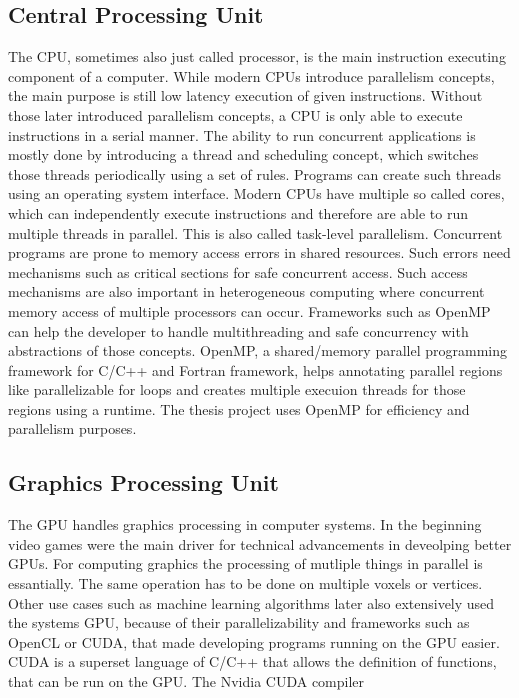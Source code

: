 \subsection{Central Processing Unit}
The \acrshort{CPU}, sometimes also just called processor, is the main instruction executing component of a computer. While modern \acrshort{CPU}s introduce parallelism concepts, the main purpose is still low latency execution of given instructions.
Without those later introduced parallelism concepts, a \acrshort{CPU} is only able to execute instructions in a serial manner. The ability to run concurrent applications is mostly done by introducing a thread and scheduling concept, which switches those threads periodically using a set of rules. Programs can create such threads using an operating system interface.
Modern \acrshort{CPU}s have multiple so called cores, which can independently execute instructions and therefore are able to run multiple threads in parallel. This is also called task-level parallelism.
Concurrent programs are prone to memory access errors in shared resources. Such errors need mechanisms such as critical sections for safe concurrent access. Such access mechanisms are also important in heterogeneous computing where concurrent memory access of multiple processors can occur.
Frameworks such as OpenMP can help the developer to handle multithreading and safe concurrency with abstractions of those concepts. OpenMP, a shared/memory parallel programming framework for C/C++ and Fortran framework, helps annotating parallel regions like parallelizable for loops and creates multiple execuion threads for those regions using a runtime.
The thesis project uses OpenMP for efficiency and parallelism purposes.

\subsection{Graphics Processing Unit}
The \acrshort{GPU} handles graphics processing in computer systems. In the beginning video games were the main driver for technical advancements in deveolping better \acrshort{GPU}s. For computing graphics the processing of mutliple things in parallel is essantially. The same operation has to be done on multiple voxels or vertices. Other use cases such as machine learning algorithms later also extensively used the systems \acrshort{GPU}, because of their parallelizability and frameworks such as OpenCL or CUDA, that made developing programs running on the GPU easier.
CUDA is a superset language of C/C++ that allows the definition of functions, that can be run on the \acrshort{GPU}. The Nvidia CUDA compiler 

